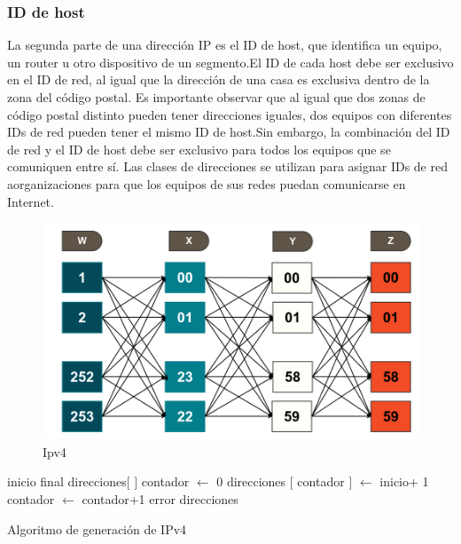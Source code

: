 \subsubsection{ID de host}
La segunda parte de una direcci\'on IP es el ID de host, que identifica un equipo, un router u otro dispositivo de un segmento.El ID de cada host debe ser exclusivo en el ID de red, al igual que la direcci\'on de una casa es exclusiva dentro de la zona del c\'odigo postal. Es importante observar que al igual que dos zonas de c\'odigo postal distinto pueden tener direcciones iguales, dos equipos con diferentes IDs de red pueden tener el mismo ID de host.Sin embargo, la combinaci\'on del ID de red y el ID de host debe ser exclusivo para todos los equipos que se comuniquen entre s\'i. Las clases de direcciones se utilizan para asignar IDs de red aorganizaciones para que los equipos de sus redes puedan comunicarse en Internet.
\begin{figure}[H]
\centering
\includegraphics[scale=0.5]{images/ipv4.png}
\caption{Ipv4}
\end{figure}
\begin{algorithm}[H]
\begin{algorithmic}[1]
\REQUIRE inicio final
\STATE direcciones$[$ $]$
\STATE contador $\leftarrow$ 0
	\STATE direcciones $[$ contador $]$ $\leftarrow$ inicio+ 1
	\STATE contador $\leftarrow$ contador+1
	\ENDWHILE
\ELSE
	\RETURN error
\ENDIF
\RETURN direcciones
\end{algorithmic}
\caption{Algoritmo de generaci\'on de IPv4}\label{alg:algoritmoGeneracionIPv4}
\end{algorithm}